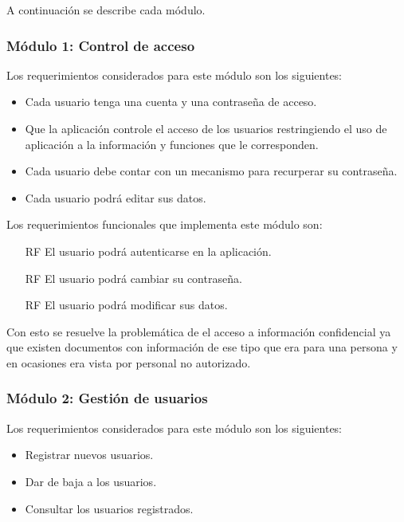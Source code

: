 A continuación se describe cada módulo.

\subsubsection{Módulo 1: Control de acceso}
Los requerimientos considerados para este módulo son los siguientes:
\begin{itemize}
	\item Cada usuario tenga una cuenta y una contraseña de acceso.
	\item Que la aplicación controle el acceso de los usuarios restringiendo el uso de aplicación a la información y funciones que le corresponden.
	\item Cada usuario debe contar con un mecanismo para recurperar su contraseña.
	\item Cada usuario podrá editar sus datos.
\end{itemize} 

Los requerimientos funcionales que implementa este módulo son:
\begin{itemize}
	\item[RF] El usuario podrá autenticarse en la aplicación.
	\item[RF] El usuario podrá cambiar su contraseña.
	\item[RF] El usuario podrá modificar sus datos.
\end{itemize}

Con esto se resuelve la problemática de el acceso a información confidencial ya que existen documentos con información de ese tipo que era para una persona y en ocasiones era vista por personal no autorizado.


\subsubsection{Módulo 2: Gestión de usuarios}
Los requerimientos considerados para este módulo son los siguientes:
\begin{itemize}
	\item Registrar nuevos usuarios.
	\item Dar de baja a los usuarios.
	\item Consultar los usuarios registrados.
\end{itemize}

